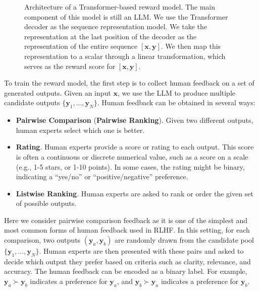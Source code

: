 \begin{figure}[!t]
\centering

\caption{Architecture of a Transformer-based reward model. The main component of this model is still an LLM. We use the Transformer decoder as the sequence representation model. We take the representation at the last position of the decoder as the representation of the entire sequence $[\mathbf{x},\mathbf{y}]$. We then map this representation to a scalar through a linear transformation, which serves as the reward score for $[\mathbf{x},\mathbf{y}]$.}
\label{fig:reward-model-architecture}
\end{figure}

To train the reward model, the first step is to collect human feedback on a set of generated outputs. Given an input $\mathbf{x}$, we use the LLM to produce multiple candidate outputs $\{\mathbf{y}_1,...,\mathbf{y}_N\}$. Human feedback can be obtained in several ways:

\begin{itemize}
\item \vspace{0.5cm} \textbf{Pairwise Comparison} (\textbf{Pairwise Ranking}). Given two different outputs, human experts select which one is better.
\item \vspace{0.3cm} \textbf{Rating}. Human experts provide a score or rating to each output. This score is often a continuous or discrete numerical value, such as a score on a scale (e.g., 1-5 stars, or 1-10 points). In some cases, the rating might be binary, indicating a ``yes/no'' or ``positive/negative'' preference.
\item \vspace{0.3em} \textbf{Listwise Ranking}. Human experts are asked to rank or order the given set of possible outputs.
\end{itemize}
\vspace{0.5em}

Here we consider pairwise comparison feedback as it is one of the simplest and most common forms of human feedback used in RLHF.  In this setting, for each comparison, two outputs $(\mathbf{y}_a,\mathbf{y}_b)$ are randomly drawn from the candidate pool $\{\mathbf{y}_1,...,\mathbf{y}_N\}$. Human experts are then presented with these pairs and asked to decide which output they prefer based on criteria such as clarity, relevance, and accuracy. The human feedback can be encoded as a binary label. For example, $\mathbf{y}_a \succ \mathbf{y}_b$ indicates a preference for $\mathbf{y}_a$, and $\mathbf{y}_b \succ \mathbf{y}_a$ indicates a preference for $\mathbf{y}_b$.

